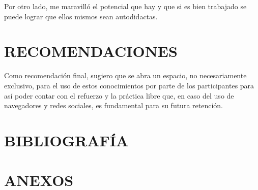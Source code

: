 \documentclass[letterpaper,12pt]{article}
\begin{document}
    Por otro lado, me maravilló el potencial que hay y que si es bien trabajado se puede
    lograr que ellos mismos sean autodidactas.    
	\pagebreak
    
    \section{RECOMENDACIONES}
	Como recomendación final, sugiero que se abra un espacio, no necesariamente exclusivo, para el uso de estos conocimientos por parte de los participantes para así poder contar con el refuerzo y la práctica libre que, en caso del uso de navegadores y redes sociales, es fundamental para su futura retención.
    \pagebreak
    
	\section{BIBLIOGRAFÍA}
	\pagebreak
	
	\section{ANEXOS}
\end{document}
